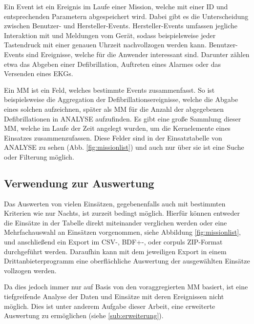 Ein Event ist ein Ereignis im Laufe einer Mission, welche mit einer ID und entsprechenden Parametern abgespeichert wird.
Dabei gibt es die Unterscheidung zwischen Benutzer- und Hersteller-Events.
Hersteller-Events umfassen jegliche Interaktion mit und Meldungen vom Gerät, sodass beispielsweise jeder Tastendruck mit einer genauen Uhrzeit nachvollzogen werden kann.
Benutzer-Events sind Ereignisse, welche für die Anwender interessant sind. 
Darunter zählen etwa das Abgeben einer Defibrillation, Auftreten eines Alarmes oder das Versenden eines \gls{EKG}s.

Ein \gls{MM} ist ein Feld, welches bestimmte Events zusammenfasst.
So ist beispielsweise die Aggregation der Defibrillationsereignisse, welche die Abgabe eines solchen aufzeichnen, später als MM für die Anzahl der abgegebenen Defibrillationen in ANALYSE aufzufinden.
Es gibt eine große Sammlung dieser MM, welche im Laufe der Zeit angelegt wurden, um die Kernelemente eines Einsatzes zusammenzufassen.
Diese Felder sind in der Einsatztabelle von ANALYSE zu sehen (Abb. \ref{fig:missionlist}) und auch nur über sie ist eine Suche oder Filterung möglich.


\subsection{Verwendung zur Auswertung}
Das Auswerten von vielen Einsätzen, gegebenenfalls auch mit bestimmten Kriterien wie \glqq nur Nachts\grqq, ist zurzeit bedingt möglich.
Hierfür können entweder die Einsätze in der Tabelle direkt miteinander verglichen werden oder eine Mehrfachauswahl an Einsätzen vorgenommen, siehe Abbildung \ref{fig:missionlist}, und anschließend ein Export im CSV-, BDF+-, oder \glqq corpuls ZIP\grqq -Format durchgeführt werden.
Daraufhin kann mit dem jeweiligen Export in einem Drittanbieterprogramm eine oberflächliche Auswertung der ausgewählten Einsätze vollzogen werden.

Da dies jedoch immer nur auf Basis von den voraggregierten \gls{MM} basiert, ist eine tiefgreifende Analyse der Daten und Einsätze mit deren Ereignissen nicht möglich.
Dies ist unter anderem Aufgabe dieser Arbeit, eine erweiterte Auswertung zu ermöglichen (siehe \ref{sub:erweiterung}).


